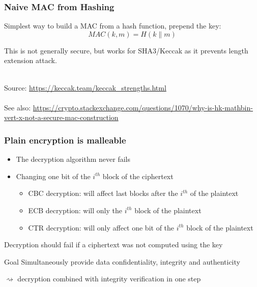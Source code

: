 \documentclass[aspectratio=169, lualatex, handout, 10pt,dvipsnames,svgnames]{beamer} %
\def\engris#1{\textcolor{gris}{#1}}
\def\enrouge#1{\textcolor{rouge}{#1}}
\begin{document}
\begin{frame}

  \frametitle{Naive MAC from Hashing}

  Simplest way to build a MAC from a hash function, prepend the key:
  \[
  MAC(k,m) = H(k \| m)
  \]

  This is not generally secure, but works for SHA3/Keccak as it prevents length extension attack. \\ \

\engris{Source: \url{https://keccak.team/keccak_strengths.html}} \\ \ \\ 

\engris{See also: \url{https://crypto.stackexchange.com/questions/1070/why-is-hk-mathbin-vert-x-not-a-secure-mac-construction}}
\end{frame}



\begin{frame}
  \maketitle
\end{frame}


\begin{frame}
  \frametitle{Plain encryption is malleable}

  \begin{itemize}
  \item The decryption algorithm never fails
  \item Changing one bit of the $i^{th}$ block of the ciphertext
    \begin{itemize}
    \item CBC decryption: will affect last blocks after the $i^{th}$ of the plaintext
    \item ECB decryption: will only the $i^{th}$ block of the plaintext
    \item CTR decryption: will only affect one bit of the $i^{th}$ block of the plaintext
    \end{itemize}
    
  \end{itemize}
  \bigskip{}

  \begin{block}{}
    Decryption should fail if a ciphertext was not computed using the key
  \end{block}
  \begin{block}{Goal}
    Simultaneously provide data \enrouge{confidentiality}, \enrouge{integrity} and \enrouge{authenticity}
    
    \enrouge{$\rightsquigarrow$} decryption combined with integrity verification in one step
  \end{block}


\end{frame}
\end{document}
